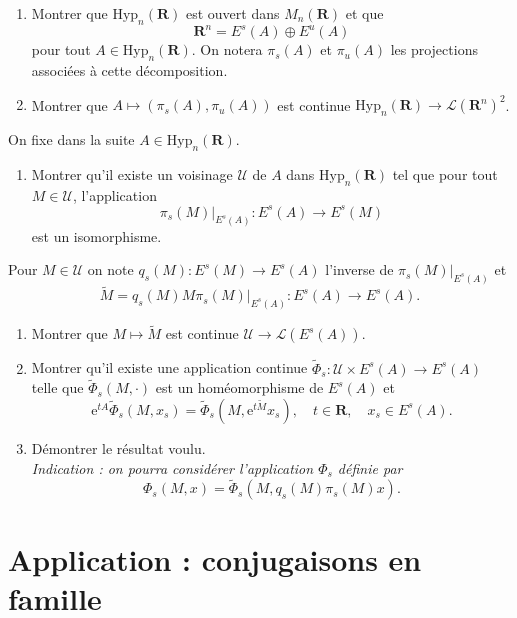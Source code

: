 \documentclass[a4paper,12pt]{article}
\theoremstyle{plain}
\theoremstyle{definition}
\newcommand{\e}{\mathrm{e}}
\newcommand{\R}{\mathbf{R}}
\begin{document}
\begin{enumerate}[resume, label=\textbf{\arabic*.}]

\item Montrer que $\mathrm{Hyp}_n(\R)$ est ouvert dans $M_n(\R)$ et que 
$$\R^n = E^s(A) \oplus E^u(A)$$ pour tout $A \in \mathrm{Hyp}_n(\R)$. On notera $\pi_s(A)$ et $\pi_u(A)$ les projections associ\'ees \`a cette d\'ecomposition.


\item Montrer que $A \mapsto (\pi_{s}(A), \pi_u(A))$ est continue $\mathrm{Hyp}_n(\R) \to \mathcal{L}(\R^n)^2$.

\end{enumerate}
On fixe dans la suite $A \in \mathrm{Hyp}_n(\R)$.  

\begin{enumerate}[resume, label=\textbf{\arabic*.}]

\item Montrer qu'il existe un voisinage $\mathcal{U}$ de $A$ dans $\mathrm{Hyp}_n(\R)$ tel que pour tout $M \in \mathcal{U}$, l'application
$$
\pi_s(M)|_{E^s(A)} : E^s(A) \to E^s(M)
$$
est un isomorphisme. 

\end{enumerate}
Pour $M \in \mathcal{U}$ on note $q_s(M) : E^s(M) \to E^s(A)$ l'inverse de $\pi_s(M)|_{E^s(A)}$ et 
$$\widetilde{M} = q_s(M) M \pi_s(M)|_{E^s(A)} : E^s(A) \to E^s(A).$$

\begin{enumerate}[resume, label=\textbf{\arabic*.}]

\item Montrer que $M \mapsto \widetilde{M}$ est continue $\mathcal{U} \to \mathcal{L}(E^s(A)).$

\item Montrer qu'il existe une application continue $\widetilde{\Phi}_s : \mathcal{U} \times E^s(A) \to E^s(A)$ telle que $\widetilde{\Phi}_s(M, \cdot)$ est un hom\'eomorphisme de $E^s(A)$ et
$$
\e^{tA}\widetilde{\Phi}_s(M,x_s) = \widetilde{\Phi}_s(M, \e^{t\widetilde{M}}x_s), \quad t \in \R, \quad x_s \in E^s(A).
$$

\item D\'emontrer le r\'esultat voulu. \\
\textit{Indication : on pourra consid\'erer l'application $\Phi_s$ d\'efinie par
$$
\Phi_s(M,x) = \widetilde{\Phi}_s(M, q_s(M)\pi_s(M)x).
$$}
\end{enumerate}

\section*{Application : conjugaisons en famille}
\end{document}
